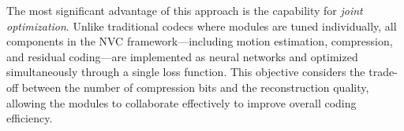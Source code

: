 The most significant advantage of this approach is the capability for \textit{joint optimization}. Unlike traditional codecs where modules are tuned individually, all components in the NVC framework—including motion estimation, compression, and residual coding—are implemented as neural networks and optimized simultaneously through a single loss function. This objective considers the trade-off between the number of compression bits and the reconstruction quality, allowing the modules to collaborate effectively to improve overall coding efficiency.







